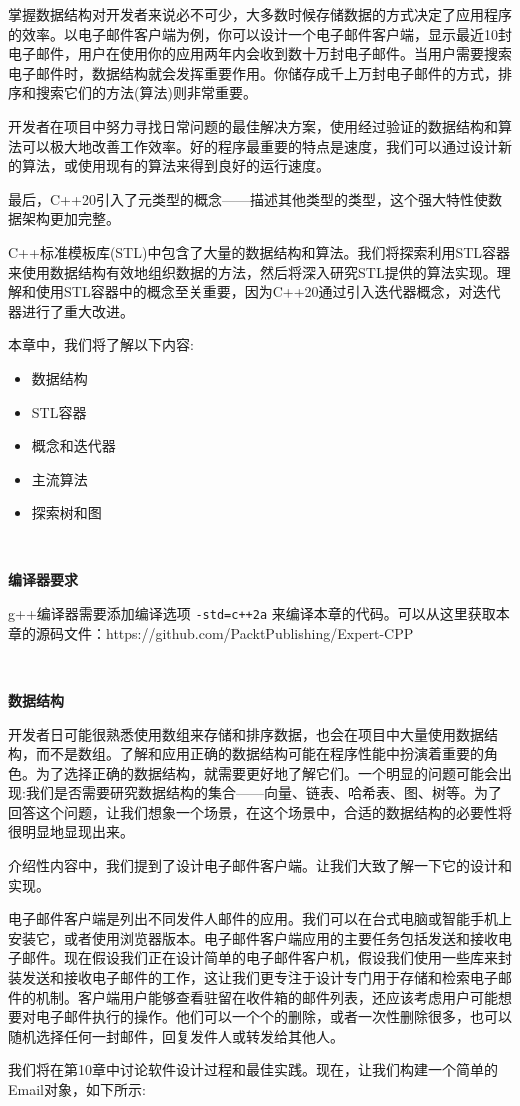 掌握数据结构对开发者来说必不可少，大多数时候存储数据的方式决定了应用程序的效率。以电子邮件客户端为例，你可以设计一个电子邮件客户端，显示最近10封电子邮件，用户在使用你的应用两年内会收到数十万封电子邮件。当用户需要搜索电子邮件时，数据结构就会发挥重要作用。你储存成千上万封电子邮件的方式，排序和搜索它们的方法(算法)则非常重要。 \par
开发者在项目中努力寻找日常问题的最佳解决方案，使用经过验证的数据结构和算法可以极大地改善工作效率。好的程序最重要的特点是速度，我们可以通过设计新的算法，或使用现有的算法来得到良好的运行速度。 \par
最后，C++20引入了元类型的概念——描述其他类型的类型，这个强大特性使数据架构更加完整。 \par
C++标准模板库(STL)中包含了大量的数据结构和算法。我们将探索利用STL容器来使用数据结构有效地组织数据的方法，然后将深入研究STL提供的算法实现。理解和使用STL容器中的概念至关重要，因为C++20通过引入迭代器概念，对迭代器进行了重大改进。 \par
本章中，我们将了解以下内容: \par

\begin{itemize}
	\item 数据结构
	\item STL容器
	\item 概念和迭代器
	\item 主流算法
	\item 探索树和图
\end{itemize}

\noindent\textbf{}\ \par
\textbf{编译器要求} \ \par
g++编译器需要添加编译选项 \texttt{-std=c++2a} 来编译本章的代码。可以从这里获取本章的源码文件：https:/​/github.​com/PacktPublishing/Expert-CPP \par

\noindent\textbf{}\ \par
\textbf{数据结构} \ \par
开发者日可能很熟悉使用数组来存储和排序数据，也会在项目中大量使用数据结构，而不是数组。了解和应用正确的数据结构可能在程序性能中扮演着重要的角色。为了选择正确的数据结构，就需要更好地了解它们。一个明显的问题可能会出现:我们是否需要研究数据结构的集合——向量、链表、哈希表、图、树等。为了回答这个问题，让我们想象一个场景，在这个场景中，合适的数据结构的必要性将很明显地显现出来。 \par
介绍性内容中，我们提到了设计电子邮件客户端。让我们大致了解一下它的设计和实现。 \par
电子邮件客户端是列出不同发件人邮件的应用。我们可以在台式电脑或智能手机上安装它，或者使用浏览器版本。电子邮件客户端应用的主要任务包括发送和接收电子邮件。现在假设我们正在设计简单的电子邮件客户机，假设我们使用一些库来封装发送和接收电子邮件的工作，这让我们更专注于设计专门用于存储和检索电子邮件的机制。客户端用户能够查看驻留在收件箱的邮件列表，还应该考虑用户可能想要对电子邮件执行的操作。他们可以一个个的删除，或者一次性删除很多，也可以随机选择任何一封邮件，回复发件人或转发给其他人。 \par
我们将在第10章中讨论软件设计过程和最佳实践。现在，让我们构建一个简单的Email对象，如下所示: \par

